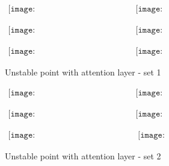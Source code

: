 \documentclass{article}
\numberwithin{equation}{section}
\begin{document}
\begin{figure}[!htbp]
\caption{Unstable point with attention layer - set 1}\label{f7}
\begin{center}$
\begin{array}{cc}
\texttt{[image: Ex2\_Unstable\_Point\_Sample\_0]}&
\texttt{[image: Ex2\_Unstable\_Point\_Sample\_1]}
\end{array}$
\end{center}
\begin{center}$
\begin{array}{cc}
\texttt{[image: Ex2\_Unstable\_Point\_Sample\_2]}&
\texttt{[image: Ex2\_Unstable\_Point\_Sample\_3]}
\end{array}$
\end{center}
\begin{center}$
\begin{array}{cc}
\texttt{[image: Ex2\_Unstable\_Point\_Sample\_4]}&
\texttt{[image: Ex2\_Unstable\_Point\_Sample\_5]}
\end{array}$
\end{center}
\end{figure}

\begin{figure}[!htbp]
\caption{Unstable point with attention layer - set 2}\label{f8}
\begin{center}$
\begin{array}{cc}
\texttt{[image: Ex2\_Unstable\_Point\_Sample\_6]}&
\texttt{[image: Ex2\_Unstable\_Point\_Sample\_7]}
\end{array}$
\end{center}
\begin{center}$
\begin{array}{cc}
\texttt{[image: Ex2\_Unstable\_Point\_Sample\_8]}&
\texttt{[image: Ex2\_Unstable\_Point\_Sample\_9]}
\end{array}$
\end{center}
\begin{center}$
\begin{array}{cc}
\texttt{[image: Ex2\_Unstable\_Point\_Sample\_10]}&
\texttt{[image: Ex2\_Unstable\_Point\_Sample\_9]}
\end{array}$
\end{center}
\end{figure}
\end{document}
